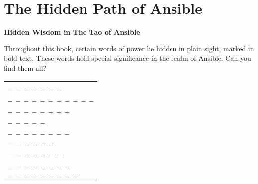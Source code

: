 \chapter*{The Hidden Path of Ansible}

\begin{center}
\large{\textbf{Hidden Wisdom in The Tao of Ansible}}
\end{center}


\noindent Throughout this book, certain words of power lie hidden in plain sight, marked in bold text. These words hold special significance in the realm of Ansible. Can you find them all?


\begin{center}
\begin{tabular}{l}
\texttt{\large{\_  \_  \_  \_  \_  \_  \_}} \\[0.3cm]
\texttt{\large{\_  \_  \_  \_  \_  \_  \_  \_  \_  \_  \_}} \\[0.3cm]
\texttt{\large{\_  \_  \_  \_  \_  \_  \_  \_}} \\[0.3cm]
\texttt{\large{\_  \_  \_  \_  \_}} \\[0.3cm]
\texttt{\large{\_  \_  \_  \_  \_  \_  \_  \_}} \\[0.3cm]
\texttt{\large{\_  \_  \_  \_  \_  \_}} \\[0.3cm]
\texttt{\large{\_  \_  \_  \_  \_  \_  \_}} \\[0.3cm]
\texttt{\large{\_  \_  \_  \_  \_  \_  \_  \_}} \\[0.3cm]
\texttt{\large{\_  \_  \_  \_  \_  \_  \_  \_  \_}} \\[0.3cm]


\end{tabular}
\end{center}


\noindent{}


